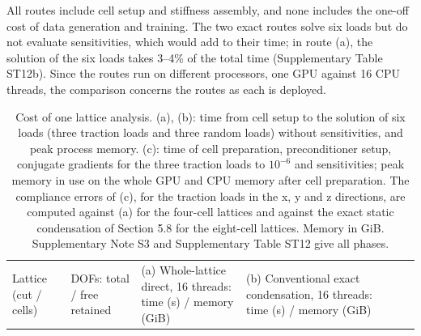 \documentclass[preprint,12pt,authoryear]{elsarticle}
\begin{document}
All routes include cell setup and stiffness assembly, and none includes the one-off cost of data generation and training. The two exact routes solve six loads but do not evaluate sensitivities, which would add to their time; in route (a), the solution of the six loads takes 3--4\% of the total time (Supplementary Table ST12b). Since the routes run on different processors, one GPU against 16 CPU threads, the comparison concerns the routes as each is deployed.

{\footnotesize
\begin{longtable}[]{@{}
  >{\raggedright\arraybackslash}p{}
  >{\raggedright\arraybackslash}p{}
  >{\raggedright\arraybackslash}p{}
  >{\raggedright\arraybackslash}p{}
  >{\raggedright\arraybackslash}p{}
  >{\raggedright\arraybackslash}p{}
  >{\raggedright\arraybackslash}p{}@{}}
\caption{Cost of one lattice analysis. (a), (b): time from cell setup to the solution of six loads (three traction loads and three random loads) without sensitivities, and peak process memory. (c): time of cell preparation, preconditioner setup, conjugate gradients for the three traction loads to \(10^{-6}\) and sensitivities; peak memory in use on the whole GPU and CPU memory after cell preparation. The compliance errors of (c), for the traction loads in the x, y and z directions, are computed against (a) for the four-cell lattices and against the exact static condensation of Section 5.8 for the eight-cell lattices. Memory in GiB. Supplementary Note S3 and Supplementary Table ST12 give all phases.}\tabularnewline
\toprule\noalign{}
\begin{minipage}[b]{\linewidth}\raggedright
Lattice (cut / cells)
\end{minipage} & \begin{minipage}[b]{\linewidth}\raggedright
DOFs: total / free retained
\end{minipage} & \begin{minipage}[b]{\linewidth}\raggedright
(a) Whole-lattice direct, 16 threads: time (s) / memory (GiB)
\end{minipage} & \begin{minipage}[b]{\linewidth}\raggedright
(b) Conventional exact condensation, 16 threads: time (s) / memory (GiB)
\end{minipage} & \begin{minipage}[b]{\linewidth}\raggedright

\end{minipage}
\end{longtable}}
\end{document}

